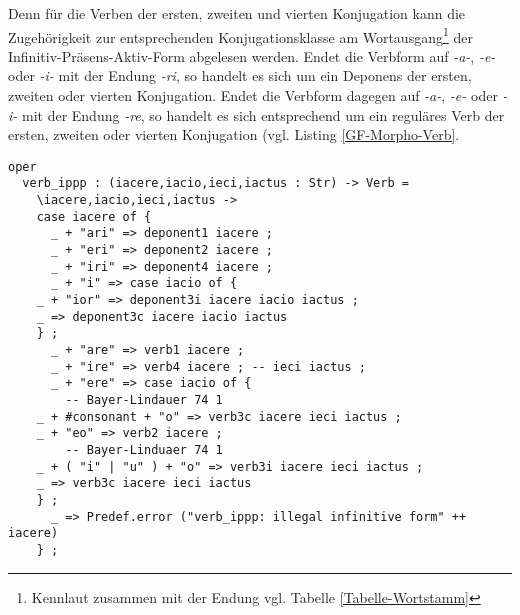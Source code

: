Denn für die Verben der ersten, zweiten und vierten Konjugation kann die Zugehörigkeit zur entsprechenden Konjugationsklasse am Wortausgang\footnote{Kennlaut zusammen mit der Endung vgl. Tabelle \ref{Tabelle-Wortstamm}} der Infinitiv-Präsens-Aktiv-Form abgelesen werden. Endet die Verbform auf \textit{-a-}, \textit{-e-} oder \textit{-i-} mit der Endung \textit{-ri}, so handelt es sich um ein Deponens der ersten, zweiten oder vierten Konjugation. Endet die Verbform dagegen auf \textit{-a-}, \textit{-e-} oder \textit{-i-} mit der Endung \textit{-re}, so handelt es sich entsprechend um ein reguläres Verb der ersten, zweiten oder vierten Konjugation (vgl. Listing \ref{GF-Morpho-Verb}. \par
\begin{lstlisting}[float=h!tp,caption={Smart Paradigm für vier Verbformen (vgl. \textbf{MorphoLat.gf})},label={GF-Morpho-Verb-Ippp},basicstyle=\small]
oper
  verb_ippp : (iacere,iacio,ieci,iactus : Str) -> Verb = 
    \iacere,iacio,ieci,iactus ->
    case iacere of {
      _ + "ari" => deponent1 iacere ;
      _ + "eri" => deponent2 iacere ;
      _ + "iri" => deponent4 iacere ;
      _ + "i" => case iacio of {
  	_ + "ior" => deponent3i iacere iacio iactus ;
  	_ => deponent3c iacere iacio iactus
  	} ;
      _ + "are" => verb1 iacere ;
      _ + "ire" => verb4 iacere ; -- ieci iactus ;
      _ + "ere" => case iacio of {
        -- Bayer-Lindauer 74 1
  	_ + #consonant + "o" => verb3c iacere ieci iactus ; 
  	_ + "eo" => verb2 iacere ;
        -- Bayer-Linduaer 74 1
  	_ + ( "i" | "u" ) + "o" => verb3i iacere ieci iactus ; 
  	_ => verb3c iacere ieci iactus
  	} ;
      _ => Predef.error ("verb_ippp: illegal infinitive form" ++ iacere) 
    } ;
\end{lstlisting}
